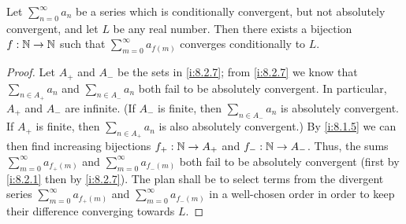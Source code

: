 \begin{thm}\label{i:8.2.8}
  Let \(\sum_{n = 0}^\infty a_n\) be a series which is conditionally convergent, but not absolutely convergent, and let \(L\) be any real number.
  Then there exists a bijection \(f : \mathbb{N} \to \mathbb{N}\) such that \(\sum_{m = 0}^\infty a_{f(m)}\) converges conditionally to \(L\).
\end{thm}

\begin{proof}
  Let \(A_+\) and \(A_-\) be the sets in \cref{i:8.2.7};
  from \cref{i:8.2.7} we know that \(\sum_{n \in A_+} a_n\) and \(\sum_{n \in A_-} a_n\) both fail to be absolutely convergent.
  In particular, \(A_+\) and \(A_-\) are infinite.
  (If \(A_-\) is finite, then \(\sum_{n \in A_-} a_n\) is absolutely convergent.
  If \(A_+\) is finite, then \(\sum_{n \in A_+} a_n\) is also absolutely convergent.)
  By \cref{i:8.1.5} we can then find increasing bijections \(f_+ : \mathbb{N} \to A_+\) and \(f_- : \mathbb{N} \to A_-\).
  Thus, the sums \(\sum_{m = 0}^\infty a_{f_+(m)}\) and \(\sum_{m = 0}^\infty a_{f_-(m)}\) both fail to be absolutely convergent (first by \cref{i:8.2.1} then by \cref{i:8.2.7}).
  The plan shall be to select terms from the divergent series \(\sum_{m = 0}^\infty a_{f_+(m)}\) and \(\sum_{m = 0}^\infty a_{f_-(m)}\) in a well-chosen order in order to keep their difference converging towards \(L\).


\end{proof}
